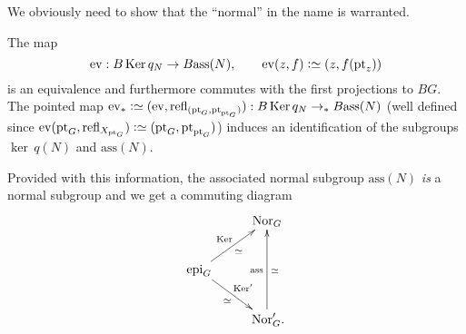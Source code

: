 We obviously need to show that the ``normal'' in the name is warranted.
\begin{lemma}
  \label{lem:normalsarekernels}
The map
$$\mathrm{ev}:B\ker q_N\to B\mathrm{ass}(N),\qquad \mathrm{ev}(z,f)\defequi(z,f(\pt_z))$$ is an equivalence and furthermore commutes with the first projections to $BG$.  The pointed map $\mathrm{ev}_*\defequi(\mathrm{ev},\refl{(\pt_G,\pt_{\pt_G})}):B\ker q_N\to_* B\mathrm{ass}(N)$
(well defined since $\mathrm{ev}(\pt_G,\refl{X_{\pt_G}})\defequi (\pt_G,\pt_{\pt_G})$) induces an identification of the subgroups $\ker\,q(N)$ and $\mathrm{ass}(N)$.  

Provided with this information, the associated normal subgroup $\mathrm{ass}(N)$ \emph{is} a normal subgroup and we get a commuting diagram
$$\xymatrix{&\typenormal_G\\
\epi_G\ar[ur]^{\ker}_{\simeq}\ar[dr]^{\ker'}_\simeq&\\
&\,\typenormal_G'.\ar[uu]^{\mathrm{ass}}_\simeq}$$
  
\end{lemma}
